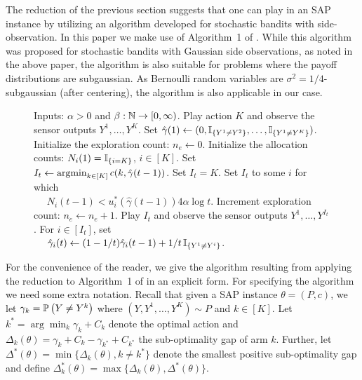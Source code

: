 \newcommand{\set}{\leftarrow}
\newcommand{\hgamma}{\hat{\gamma}}
The reduction of the previous section suggests that one can play in an SAP instance by utilizing 
an algorithm developed for stochastic bandits with side-observation.
In this paper we make use of Algorithm~1 of \citet{WGySz:NIPS15}. 
While this algorithm was proposed for stochastic bandits with Gaussian side observations, 
as noted in the above paper, the algorithm is also suitable for problems where the payoff distributions are subgaussian.
As Bernoulli random variables are $\sigma^2=1/4$-subgaussian (after centering),
the algorithm is also applicable in our case.

\begin{wrapfigure}{L}{0.55\textwidth}
\vspace{-0.4cm}
\begin{minipage}{0.54\textwidth}
\begin{algorithm}[H]
\caption{} %
\label{alg:asym}
\begin{algorithmic}[1]
\STATE Inputs: $\alpha>0$ and $\beta: \mathbb{N} \to [0,\infty)$.
\STATE Play action $K$ and observe the sensor outputs $Y^1,\dots,Y^K$.
\STATE Set $\hgamma(1) \set (0,\one{Y^1\ne Y^2},\dots,\one{Y^1\ne Y^K})$.
\STATE Initialize the exploration count: $n_e \set 0$.
\STATE Initialize the allocation counts: $N_i(1) = \mathbb{I}_{\{i=K\}}$, $i\in [K]$.
	\IF{$\frac{N(t-1)}{4\alpha \log t}\in C(\hgamma(t-1))$} \label{alg:check}
		\STATE Set $I_t \set \argmin_{k\in [K]} c(k,\hgamma(t-1))$. \label{alg:greedy}
	\ELSE
		 \label{alg:starve}
			\STATE Set $I_t =K$. \label{alg:forced}
		\ELSE
			\STATE Set $I_t$ to some $i$ for which \label{alg:plan} \\
			$\quad$ $N_i(t-1)< u_i^*(\hgamma(t-1))4\alpha\log t$.
		\ENDIF
		\STATE Increment exploration count: $n_e \set n_e+1$.
	\ENDIF
	\STATE Play $I_t$ and observe the sensor outputs $Y^1,\dots,Y^{I_t}$.
	\STATE For $i\in [I_t]$, set\\
	$\quad$ $\hgamma_i(t) \set (1-1/t) \hgamma_i(t-1) + 1/t \,\one{Y^1\ne Y^i}$.
\ENDFOR
\end{algorithmic}
\end{algorithm}
\end{minipage}
\vspace{-0.3cm}
\end{wrapfigure}

For the convenience of the reader, we give the algorithm resulting from applying the reduction to Algorithm~1 
of \citet{WGySz:NIPS15} in an explicit form.
For specifying the algorithm we need some extra notation.
Recall that given a SAP instance $\theta = (P,c)$, we let $\gamma_k = \mathbb{P}\left(Y\ne Y^k\right)$ where $(Y,Y^1,\dots,Y^K)\sim P$ and $k\in [K]$. Let $k^*=\arg\min_k \gamma_k +C_k$ denote the optimal action and $\Delta_k(\theta)=\gamma_k+C_k-\gamma_{k^*}+C_{k^*}$ the sub-optimality gap of arm $k$. Further, let $\Delta^*(\theta) = \min\{\Delta_k(\theta), k\neq k^* \}$ denote the smallest positive sub-optimality gap and define $\Delta_k^*(\theta) =\max\{\Delta_k(\theta), \Delta^*(\theta)\}$.

